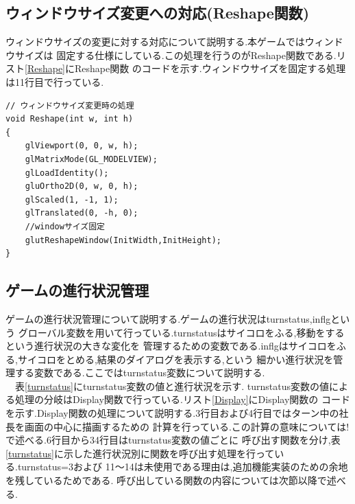 \documentclass[a4j]{jarticle}
\begin{document}
    \subsection{ウィンドウサイズ変更への対応(Reshape関数)}
    ウィンドウサイズの変更に対する対応について説明する.本ゲームではウィンドウサイズは
    固定する仕様にしている.この処理を行うのがReshape関数である.リスト\ref{Reshape}にReshape関数
    のコードを示す.ウィンドウサイズを固定する処理は11行目で行っている.
    \begin{lstlisting}[basicstyle=\ttfamily\footnotesize, frame=single,label=Reshape,caption=Reshape関数]
// ウィンドウサイズ変更時の処理
void Reshape(int w, int h)
{
    glViewport(0, 0, w, h);
    glMatrixMode(GL_MODELVIEW);
    glLoadIdentity();
    gluOrtho2D(0, w, 0, h);
    glScaled(1, -1, 1);
    glTranslated(0, -h, 0);
    //windowサイズ固定 
    glutReshapeWindow(InitWidth,InitHeight);
}
    \end{lstlisting} 
    
    \subsection{ゲームの進行状況管理}
    ゲームの進行状況管理について説明する.ゲームの進行状況はturnstatus,inflgという
    グローバル変数を用いて行っている.turnstatusはサイコロをふる,移動をするという進行状況の大きな変化を
    管理するための変数である.inflgはサイコロをふる,サイコロをとめる,結果のダイアログを表示する,という
    細かい進行状況を管理する変数である.ここではturnstatus変数について説明する. \\ 
    　表\ref{turnstatus}にturnstatus変数の値と進行状況を示す.
    turnstatus変数の値による処理の分岐はDisplay関数で行っている.リスト\ref{Display}にDisplay関数の
    コードを示す.Display関数の処理について説明する.3行目および4行目ではターン中の社長を画面の中心に描画するための
    計算を行っている.この計算の意味については!で述べる.6行目から34行目はturnstatus変数の値ごとに
    呼び出す関数を分け,表\ref{turnstatus}に示した進行状況別に関数を呼び出す処理を行っている.turnstatus=3および
    11～14は未使用である理由は,追加機能実装のための余地を残しているためである.
    呼び出している関数の内容については次節以降で述べる.
\end{document}
